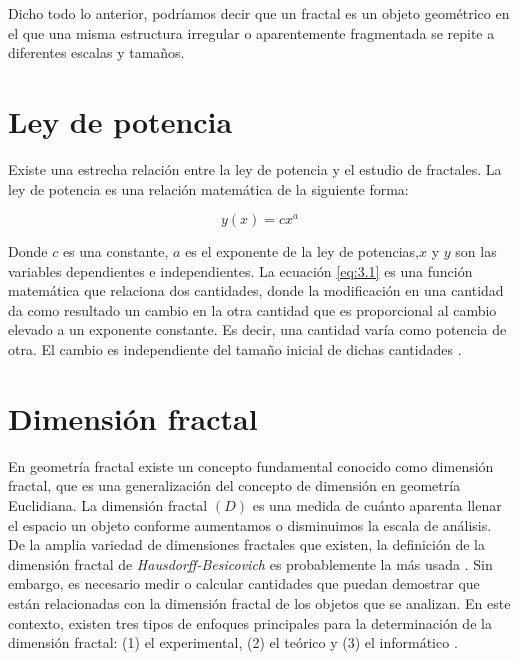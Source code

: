 Dicho todo lo anterior, podr\'{i}amos decir que un fractal es un objeto geom\'{e}trico en el que una misma estructura irregular o aparentemente fragmentada se repite a diferentes escalas y tamaños. 

\section{Ley de potencia} 

Existe una estrecha relaci\'{o}n entre la ley de potencia y el estudio de fractales. La ley de potencia es una relaci\'{o}n matem\'{a}tica de la siguiente forma:

\begin{equation}
	y(x) = cx^{a}
	\label{eq:3.1}
\end{equation}

Donde $c$ es una constante, $a$ es el exponente de la ley de potencias,$x$ y $y$ son las variables dependientes e independientes. La ecuaci\'{o}n \ref{eq:3.1} es una funci\'{o}n matem\'{a}tica que relaciona dos cantidades, donde la modificación en una cantidad da como resultado un cambio en la otra cantidad que es proporcional al cambio elevado a un exponente constante. Es decir, una cantidad var\'{i}a como potencia de otra. El cambio es independiente del tamaño inicial de dichas cantidades \cite{Meakin1998}.

\color{blue}

\section{Dimensi\'{o}n fractal}

En geometr\'{i}a fractal existe un concepto fundamental conocido como dimensi\'{o}n fractal, que es una generalizaci\'{o}n del concepto de dimensi\'{o}n en geometr\'{i}a Euclidiana. La dimensi\'{o}n fractal $(D)$ es una medida de cu\'{a}nto aparenta llenar el espacio un objeto conforme aumentamos o disminuimos la escala de an\'{a}lisis. De la  amplia variedad de dimensiones fractales que existen, la definici\'{o}n de la dimensi\'{o}n fractal de \textit{Hausdorff-Besicovich} es probablemente la m\'{a}s usada \cite{Vicsek1992, Meakin1998}. Sin embargo, es necesario medir o calcular cantidades que puedan demostrar que est\'{a}n relacionadas con la dimensi\'{o}n fractal de los objetos que se analizan. En este contexto, existen  tres tipos de enfoques principales para la determinaci\'{o}n de la dimensi\'{o}n fractal: (1) el experimental, (2) el te\'{o}rico y (3) el inform\'{a}tico \cite{Vicsek1992}.

